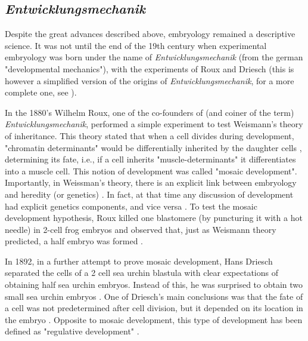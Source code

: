 \subsection{\textit{Entwicklungsmechanik}}

Despite the great advances described above, embryology remained a descriptive science. 
It was not until the end of the 19th century when experimental embryology was born under the name of \textit{Entwicklungsmechanik} (from the german "developmental mechanics"), with the experiments of Roux and Driesch (this is however a simplified version of the origins of \textit{Entwicklungsmechanik}, for a more complete one, see \citealp{Maienschein1991}).

In the 1880's Wilhelm Roux, one of the co-founders of (and coiner of the term) \textit{Entwicklungsmechanik}, performed a simple experiment to test Weismann's theory of inheritance.
%
This theory stated that when a cell divides during development, "chromatin determinants" would be differentially inherited by the daughter cells \citep{Weismann1893}, determining its fate, i.e., if a cell inherits "muscle-determinants" it differentiates into a muscle cell.
This notion of development %
was called "mosaic development".
Importantly, in Weissman's theory, there is an explicit link between embryology and heredity (or genetics) \citep{gilbert1991conceptual}. In fact, at that time any discussion of development had explicit genetics components, and vice versa \citep{gilbert1991conceptual}.
%
%
To test the mosaic development hypothesis, Roux killed one blastomere (by puncturing it with a hot needle) in 2-cell frog embryos and observed that, just as Weismann theory predicted, a half embryo was formed \citep{Roux1888}.

In 1892, in a further attempt to prove mosaic development, Hans Driesch separated the cells of a 2 cell sea urchin blastula with clear expectations of obtaining half sea urchin embryos. 
Instead of this, he was surprised to obtain two small sea urchin embryos \citep{Driesch1892}. One of Driesch's main conclusions was that the fate of a cell was not predetermined after cell division, but it depended on its location in the embryo \citep{driesch1894analytische}. 
Opposite to mosaic development, this type of development has been defined as "regulative development" \citep{Gilbert2014}.

